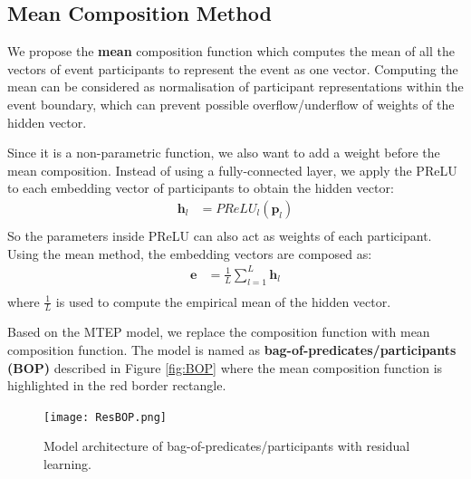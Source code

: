 \documentclass[a4paper]{article}
\begin{document}
\subsection{Mean Composition Method} \label{sec:mean-composition}
We propose the \textbf{mean} composition function which computes the mean of all the vectors of event participants to represent the event as one vector. Computing the mean can be considered as normalisation of participant representations within the event boundary, which can prevent possible overflow/underflow of weights of the hidden vector. 

Since it is a non-parametric function, we also want to add a weight before the mean composition. Instead of using a fully-connected layer, we apply the PReLU to each embedding vector of participants to obtain the hidden vector: 
\begin{equation} \label{eq:nonlinearity-bop}
\begin{aligned}
    \mathbf{h}_l
        &= PReLU_l(\mathbf{p}_l) \\
\end{aligned}
\end{equation}
So the parameters inside PReLU can also act as weights of each participant. Using the mean method, the embedding vectors are composed as:
\begin{equation} \label{eq:mean-comp-bop}
\begin{aligned}
    \mathbf{e}
        &= \frac{1}{L} \sum_{l=1}^{L} \mathbf{h}_{l} \\
\end{aligned}
\end{equation}
where $\frac{1}{L}$ is used to compute the empirical mean of the hidden vector. 

Based on the MTEP model, we replace the composition function with mean composition function. The model is named as \textbf{bag-of-predicates/participants (BOP)} described in Figure \ref{fig:BOP} where the mean composition function is highlighted in the red border rectangle. 


\begin{figure}[t]
\centering
\texttt{[image: ResBOP.png]}
\caption{\label{fig:BOPRes} Model architecture of bag-of-predicates/participants with residual learning.}
\end{figure}
% 
% 
% 
% 
% 
%
\end{document}
